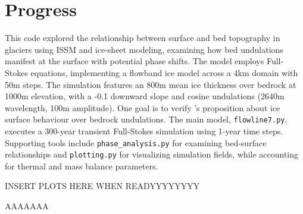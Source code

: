 \chapter{Progress}

This code explored the relationship between surface and bed topography in glaciers using ISSM and ice-sheet modeling, examining how bed undulations manifest at the surface with potential phase shifts. The model employs Full-Stokes equations, implementing a flowband ice model across a 4km domain with 50m steps. The simulation features an 800m mean ice thickness over bedrock at 1000m elevation, with a -0.1 downward slope and cosine undulations (2640m wavelength, 100m amplitude). One goal is to verify \cite{Budd_1970}'s proposition about ice surface behaviour over bedrock undulations. The main model, \texttt{flowline7.py}, executes a 300-year transient Full-Stokes simulation using 1-year time steps. Supporting tools include \texttt{phase\_analysis.py} for examining bed-surface relationships and \texttt{plotting.py} for visualizing simulation fields, while accounting for thermal and mass balance parameters.

\vspace{6cm}
INSERT PLOTS HERE WHEN READYYYYYYYY

AAAAAAA